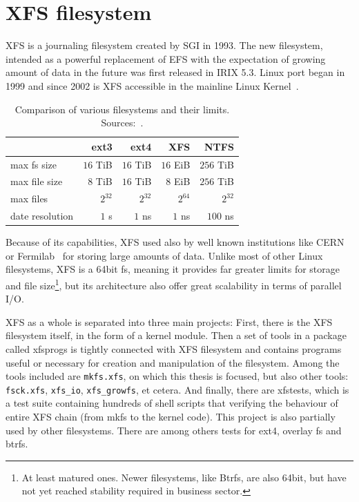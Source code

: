 
\chapter{XFS filesystem} \label{chap:xfs}

XFS is a journaling filesystem created by SGI in 1993. The new filesystem, intended as a powerful replacement of EFS with the expectation of growing amount of data in the future was first released in IRIX 5.3. Linux port began in 1999 and since 2002 is XFS accessible in the mainline Linux Kernel~\cite[Chap. 1.2, 1.3]{xfsHistory}.

\begin{table}[h]
\begin{tabular}{|l||r|r|r|r|}
\hline
& ext3 & ext4 & XFS & NTFS \\

\hline
\hline
max fs size & $16$ TiB & $16$ TiB & $16$ EiB& $256$ TiB\\
\hline
max file size & $8$ TiB & $16$ TiB & $8$ EiB & $256$ TiB\\
\hline
max files & $2^{32}$ & $2^{32}$& $2^{64}$ & $2^{32}$\\
\hline
date resolution & $1$ s & $1$ ns & $1$ ns & $100$ ns\\
\hline
\end{tabular}
\caption{Comparison of various filesystems and their limits. Sources:~\cite{inodesInLinux,NTFS1,NTFS2,NTFSfiletime,XFSforLinux}.}
\label{tab:xfs:comparison}
\end{table}



Because of its capabilities, XFS used also by well known institutions like CERN or Fermilab~\cite{XFSforLinux} for storing large amounts of data. Unlike most of other Linux filesystems, XFS is a 64bit fs, meaning it provides far greater limits for storage and file size\footnote{At least matured ones. Newer filesystems, like Btrfs, are also 64bit, but have not yet reached stability required in business sector.}, but its architecture also offer great scalability in terms of parallel I/O.

XFS as a whole is separated into three main projects: First, there is the XFS filesystem itself, in the form of a kernel module. Then a set of tools in a package called xfsprogs is tightly connected with XFS filesystem and contains programs useful or necessary for creation and manipulation of the filesystem. Among the tools included are {\tt mkfs.xfs}, on which this thesis is focused, but also other tools: {\tt fsck.xfs}, {\tt xfs\_io}, {\tt xfs\_growfs}, et cetera. And finally, there are xfstests, which is a test suite containing hundreds of shell scripts that verifying the behaviour of entire XFS chain (from mkfs to the kernel code). This project is also partially used by other filesystems. There are among others tests for ext4, overlay fs and btrfs.

